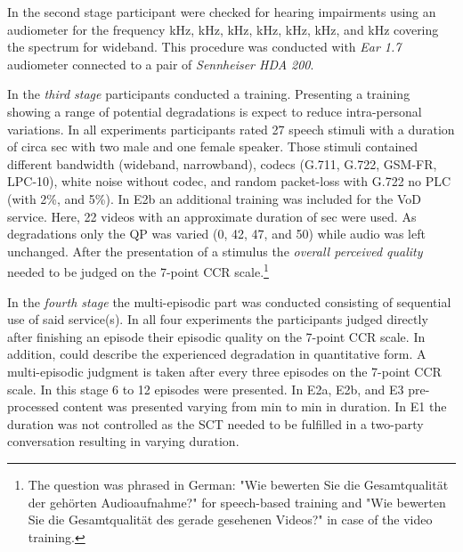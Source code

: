 In the second stage participant were checked for hearing impairments using an audiometer for the frequency \unit[125]{kHz}, \unit[250]{kHz}, \unit[500]{kHz}, \unit[1000]{kHz}, \unit[2000]{kHz}, \unit[4000]{kHz}, and \unit[8000]{kHz} covering the spectrum for wideband.
This procedure was conducted with \emph{Ear 1.7} audiometer connected to a pair of \emph{Sennheiser HDA 200}.

In the \emph{third stage} participants conducted a training.
Presenting a training showing a range of potential degradations is expect to reduce intra-personal variations.
In all experiments participants rated 27 speech stimuli with a duration of circa \unit[8]{sec} with two male and one female speaker.
Those stimuli contained different bandwidth (wideband, narrowband), codecs (G.711, G.722, GSM-FR, LPC-10), white noise without codec, and random packet-loss with G.722 no \ac{PLC} (with 2\%, and 5\%).
In E2b an additional training was included for the \ac{VoD} service.
Here, 22 videos with an approximate duration of \unit[8]{sec} were used.
As degradations only the \ac{QP} was varied (0, 42, 47, and 50) while audio was left unchanged.
After the presentation of a stimulus the \emph{overall perceived quality} needed to be judged on the 7-point \ac{CCR} scale.\footnote{The question was phrased in German: "Wie bewerten Sie die Gesamtqualität der gehörten Audioaufnahme?" for speech-based training and "Wie bewerten Sie die Gesamtqualität des gerade gesehenen Videos?" in case of the video training.}

In the \emph{fourth stage} the multi-episodic part was conducted consisting of sequential use of said service(s).
In all four experiments the participants judged directly after finishing an episode their episodic quality on the 7-point \ac{CCR} scale.
In addition, could describe the experienced degradation in quantitative form.
A multi-episodic judgment is taken after every three episodes on the 7-point \ac{CCR} scale.
In this stage 6 to 12 episodes were presented.
In E2a, E2b, and E3 pre-processed content was presented varying from \unit[2]{min} to \unit[3]{min} in duration.
In E1 the duration was not controlled as the \acs{SCT} needed to be fulfilled in a two-party conversation resulting in varying duration.

